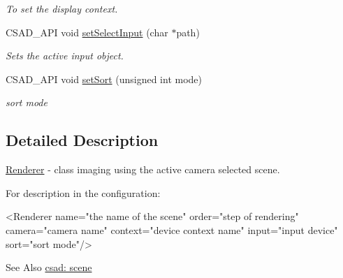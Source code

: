 \begin{DoxyCompactItemize}
\begin{DoxyCompactList}\small\item\em To set the display context. \end{DoxyCompactList}\item 
\hypertarget{classcsad_1_1_renderer_a4199a9b69589509ca07cd4fac610b9d8}{C\-S\-A\-D\-\_\-\-A\-P\-I void \hyperlink{classcsad_1_1_renderer_a4199a9b69589509ca07cd4fac610b9d8}{set\-Select\-Input} (char $\ast$path)}\label{classcsad_1_1_renderer_a4199a9b69589509ca07cd4fac610b9d8}

\begin{DoxyCompactList}\small\item\em Sets the active input object. \end{DoxyCompactList}\item 
\hypertarget{classcsad_1_1_renderer_a2b5fbf850e819cce1ce74e3e8b7de89f}{C\-S\-A\-D\-\_\-\-A\-P\-I void \hyperlink{classcsad_1_1_renderer_a2b5fbf850e819cce1ce74e3e8b7de89f}{set\-Sort} (unsigned int mode)}\label{classcsad_1_1_renderer_a2b5fbf850e819cce1ce74e3e8b7de89f}

\begin{DoxyCompactList}\small\item\em sort mode \end{DoxyCompactList}\end{DoxyCompactItemize}


\subsection{Detailed Description}
\hyperlink{classcsad_1_1_renderer}{Renderer} -\/ class imaging using the active camera selected scene. 

For description in the configuration\-: \begin{DoxyVerb}  <Renderer name="the name of the scene" order="step of rendering" camera="camera name" context="device context name" input="input device" sort="sort mode"/>
\end{DoxyVerb}


\begin{DoxySeeAlso}{See Also}
\hyperlink{group__scene}{csad\-: scene} 
\end{DoxySeeAlso}


